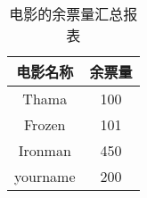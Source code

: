 \documentclass[UTF8]{ctexart}
\newcommand{\kaiti}{\CJKfamily{kaiti}}
\begin{document}
\begin{center}
    \begin{table}
        \renewcommand\arraystretch{2}
        \LARGE
        \setlength{\tabcolsep}{20mm}
        {
            \begin{tabular}{|c|c|}
                \hline
                \kaiti 电影名称 & \kaiti 余票量 \\
\hline
\kaiti Thama&\kaiti100\\
\hline
\kaiti Frozen&\kaiti101\\
\hline
\kaiti Ironman&\kaiti450\\
\hline
\kaiti yourname&\kaiti200\\
                \hline
            \end{tabular}
        }
        \caption*{电影的余票量汇总报表}
    \end{table}
\end{center}
\end{document}
